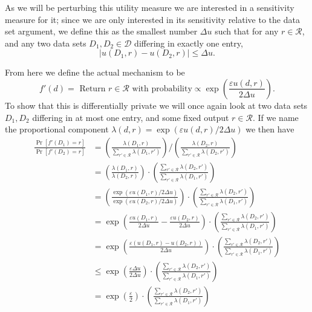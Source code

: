 \documentclass[12pt]{article}
\newcommand{\fancy}{\mathcal}
\renewcommand{\epsilon}{\varepsilon}
\begin{document}
As we will be perturbing this utility measure we are interested in a sensitivity measure for it; since we are only interested in its sensitivity relative to the data set argument, we define this as the smallest number $\Delta u$ such that for any $r \in \fancy{R}$, and any two data sets $D_1,D_2 \in \fancy{D}$ differing in exactly one entry,
\begin{equation}\label{eq:utility_sensitivity}
    |u(D_1,r) - u(D_2,r)| \leq \Delta u.
\end{equation}

From here we define the actual mechanism to be
\begin{equation*}
    f'(d) = \text{ Return } r \in \fancy{R} \text{ with probability} \propto \exp\left( \frac{\epsilon u(d,r)}{2\Delta u} \right).
\end{equation*}
To show that this is differentially private we will once again look at two data sets $D_1,D_2$ differing in at most one entry, and some fixed output $r \in \fancy{R}$. If we name the proportional component $\lambda(d,r) = \exp \left( \epsilon u(d,r) / 2 \Delta u \right)$ we then have
\begin{align}
    \frac{\Pr[f'(D_1) = r]}{\Pr[f'(D_2) = r]} &= 
                \left( \frac{\lambda(D_1,r)}{\sum_{r' \in \fancy{R}} \lambda(D_1,r')} \right)
                /
                \left( \frac{\lambda(D_2,r)}{\sum_{r' \in \fancy{R}} \lambda(D_2,r')} \right) \nonumber\\
            &= \left( \frac{\lambda(D_1,r)}{\lambda(D_2,r)} \right) \cdot \left( \frac{\sum_{r'\in\fancy{R}} \lambda(D_2,r')}{\sum_{r'\in\fancy{R}} \lambda(D_1,r')} \right) \nonumber\\
            &= \left( \frac{\exp(\epsilon u(D_1,r)/2\Delta u)}{\exp(\epsilon u(D_2,r)/2\Delta u)} \right) \cdot \left( \frac{\sum_{r'\in\fancy{R}} \lambda(D_2,r')}{\sum_{r'\in\fancy{R}} \lambda(D_1,r')} \right) \nonumber\\
            &= \exp \left( \frac{\epsilon u(D_1,r)}{2\Delta u} - \frac{\epsilon u(D_2,r)}{2\Delta u} \right) \cdot \left( \frac{\sum_{r'\in\fancy{R}} \lambda(D_2,r')}{\sum_{r'\in\fancy{R}} \lambda(D_1,r')} \right) \nonumber\\
            &= \exp \left( \frac{\epsilon (u(D_1,r) - u(D_2,r))}{2\Delta u}\right) \cdot \left( \frac{\sum_{r'\in\fancy{R}} \lambda(D_2,r')}{\sum_{r'\in\fancy{R}} \lambda(D_1,r')} \right) \nonumber\\
            &\leq \exp \left( \frac{\epsilon \Delta u}{2\Delta u}\right) \cdot \left( \frac{\sum_{r'\in\fancy{R}} \lambda(D_2,r')}{\sum_{r'\in\fancy{R}} \lambda(D_1,r')} \right) \nonumber\\
            &= \exp \left( \frac{\epsilon}{2} \right) \cdot \left( \frac{\sum_{r'\in\fancy{R}} \lambda(D_2,r')}{\sum_{r'\in\fancy{R}} \lambda(D_1,r')} \right) \label{eq:expmech}
\end{align}
\end{document}
